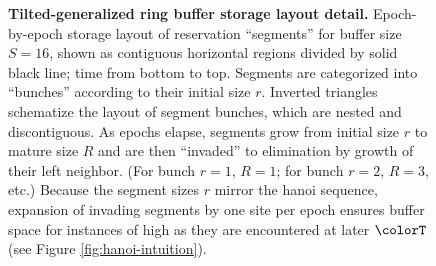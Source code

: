 \begin{figure}[htbp!]
\vspace{-1.5ex}

\caption{
    \textbf{Tilted-generalized ring buffer storage layout detail.}
    \footnotesize
    Epoch-by-epoch storage layout of \hv{} reservation ``segments''  for buffer size $S=16$, shown as contiguous horizontal regions divided by solid black line; time from bottom to top.
    Segments are categorized into ``bunches'' according to their initial size $r$.
    Inverted triangles schematize the layout of segment bunches, which are nested and discontiguous.
    As epochs elapse, segments grow from initial size $r$ to mature size $R$ and are then ``invaded'' to elimination by growth of their left neighbor.
    (For bunch $r=1$, $R=1$; for bunch $r=2$, $R=3$, etc.)
    Because the segment sizes $r$ mirror the hanoi sequence, expansion of invading segments by one site per epoch ensures buffer space for instances of high \hv{} as they are encountered at later $\colorT$ (see Figure \ref{fig:hanoi-intuition}).
  }
  \label{fig:hsurf-stretched-intuition}
\end{figure}
